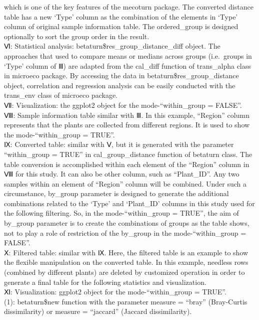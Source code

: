 \documentclass[
]{book}
\begin{document}
which is one of the key features of the mecoturn package.
The converted distance table has a new `Type' column as the combination of the elements in `Type' column of original sample information table.
The ordered\_group is designed optionally to sort the group order in the result.\\
Ⅵ: Statistical analysis: betaturn\$res\_group\_distance\_diff object.
The approaches that used to compare means or medians across groups (i.e.~groups in `Type' column of Ⅲ)
are adapted from the cal\_diff function of trans\_alpha class in microeco package.
By accessing the data in betaturn\$res\_group\_distance object,
correlation and regression analysis can be easily conducted with the trans\_env class of microeco package.\\
Ⅶ: Visualization: the ggplot2 object for the mode-``within\_group = FALSE''.\\
Ⅷ: Sample information table similar with Ⅲ.
In this example, ``Region'' column represents that the plants are collected from different regions.
It is used to show the mode-``within\_group = TRUE''.\\
Ⅸ: Converted table: similar with Ⅴ, but it is generated with the parameter ``within\_group = TRUE'' in cal\_group\_distance function of betaturn class.
The table conversion is accomplished within each element of the ``Region'' column in Ⅷ for this study.
It can also be other column, such as ``Plant\_ID''.
Any two samples within an element of ``Region'' column will be combined.
Under such a circumstance,
by\_group parameter is designed to generate the additional combinations related to the `Type' and `Plant\_ID' columns in this study used for the following filtering.
So, in the mode-``within\_group = TRUE'', the aim of by\_group parameter is to create the combinations of groups as the table shows,
not to play a role of restriction of the by\_group in the mode-``within\_group = FALSE''.\\
Ⅹ: Filtered table: similar with Ⅸ.
Here, the filtered table is an example to show the flexible manipulation on the converted table.
In this example, needless rows (combined by different plants) are deleted by customized operation in order to generate a final table for the following statistics and visualization.\\
Ⅺ: Visualization: ggplot2 object for the mode-``within\_group = TRUE''.\\
(1): betaturn\$new function with the parameter measure = ``bray'' (Bray-Curtis dissimilarity) or measure = ``jaccard'' (Jaccard dissimilarity).
\end{document}
